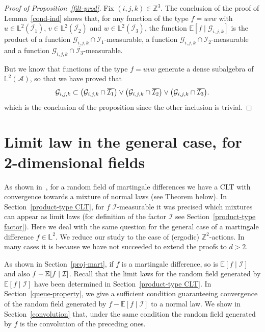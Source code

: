 \documentclass[AHL,Unicode,longabstracts,published]{cedram}
\newcommand{\Z}{\mathbb{Z}}
\newcommand*\bbL{\mathbb{L}}
\newcommand{\bbE}{\mathbb{E}}
\newcommand*\I{\mathcal{I}}
\newcommand*\A{\mathcal{A}}
\newcommand*\G{\mathcal{G}}
\let\originalleft\left
\let\originalright\right
\renewcommand{\left}{\mathopen{}\mathclose\bgroup\originalleft}
\renewcommand{\right}{\aftergroup\egroup\originalright}
\begin{document}
\begin{proof}[Proof of Proposition~\ref{filt-prod}]
Fix $(i,j,k)\in\Z^3$. The conclusion of the proof of Lemma~\ref{cond-ind} shows that, for any function of the type $f=uvw$ with $u\in \bbL^2(\overline{\I_1})$, $v\in \bbL^2(\overline{\I_2})$ and $w\in \bbL^2(\overline{\I_3})$, the function $\bbE[f\mid\G_{i,j,k}]$ is the product of a function $\G_{i,j,k}\cap\overline{\I_1}$-measurable, a function $\G_{i,j,k}\cap\overline{\I_2}$-measurable and a function $\G_{i,j,k}\cap\overline{\I_3}$-measurable.

But we know that functions of the type $f=uvw$ generate a dense subalgebra of $\bbL^2(\A)$, so that we have proved that
\[
\G_{i,j,k}\subset \left(\G_{i,j,k}\cap\overline{\I_1}\right)\vee\left(\G_{i,j,k}\cap\overline{\I_2}\right)\vee\left(\G_{i,j,k}\cap\overline{\I_3}\right).
\]
which is the conclusion of the proposition since the other inclusion is trivial.
\end{proof}



\section{Limit law in the general case, for 2-dimensional fields}\label{dim2}
As shown in~\cite{MR3913270}, for a random field of martingale differences we have a CLT with convergence towards a mixture of normal laws (see Theorem below). In Section~\ref{product-type CLT}, for $f$ $\I$-measurable it was precised which mixtures can appear as limit laws (for definition of the factor $\I$ see Section~\ref{product-type factor}). Here we deal with the same question for the general case of a martingale difference $f\in \bbL^2$. We reduce our study to the case of (ergodic) $\Z^2$-actions. In many cases it is because we have not succeeded to extend the proofs to $d>2$.

As shown in Section~\ref{proj-mart}, if $f$ is a martingale difference, so is $\bbE[f \mid \I]$ and also $f -\linebreak \bbE[f \mid \I]$. Recall that the limit laws for the random field generated by $\bbE[f \mid \I]$ have been determined in Section~\ref{product-type CLT}. In Section~\ref{queue-property}, we give a sufficient condition guaranteeing convergence of the random field generated by $f - \bbE[f \mid \I]$ to a normal law. We show in Section~\ref{convolution} that, under the same condition the random field generated by $f$ is the convolution of the preceding ones.
\end{document}
